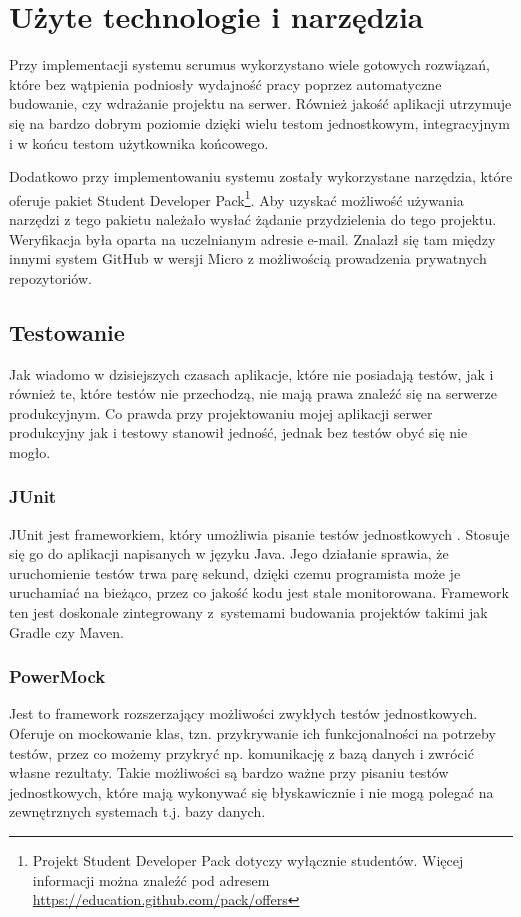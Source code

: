 \section{Użyte technologie i narzędzia}
Przy implementacji systemu scrumus wykorzystano wiele gotowych rozwiązań, które bez wątpienia podniosły wydajność pracy poprzez automatyczne budowanie, czy wdrażanie projektu na serwer. Również jakość aplikacji utrzymuje się na bardzo dobrym poziomie dzięki wielu testom jednostkowym, integracyjnym i w końcu testom użytkownika końcowego. 

Dodatkowo przy implementowaniu systemu zostały wykorzystane narzędzia, które oferuje pakiet Student Developer Pack\footnote{Projekt Student Developer Pack dotyczy wyłącznie studentów. Więcej informacji można znaleźć pod adresem \url{https://education.github.com/pack/offers}}. Aby uzyskać możliwość używania narzędzi z tego pakietu należało wysłać żądanie przydzielenia do tego projektu. Weryfikacja była oparta na uczelnianym adresie e-mail. Znalazł się tam między innymi system GitHub w wersji Micro z możliwością prowadzenia prywatnych repozytoriów.

\subsection{Testowanie}
Jak wiadomo w dzisiejszych czasach aplikacje, które nie posiadają testów, jak i również te, które testów nie przechodzą, nie mają prawa znaleźć się na serwerze produkcyjnym. Co prawda przy projektowaniu mojej aplikacji serwer produkcyjny jak i testowy stanowił jedność, jednak bez testów obyć się nie mogło.

\subsubsection{JUnit}
JUnit jest frameworkiem, który umożliwia pisanie testów jednostkowych \cite{CLEAN_CODE_MASTER}. Stosuje się go do aplikacji napisanych w języku Java. Jego działanie sprawia, że uruchomienie testów trwa parę sekund, dzięki czemu programista może je uruchamiać na bieżąco, przez co jakość kodu jest stale monitorowana. Framework ten jest doskonale zintegrowany z~systemami budowania projektów takimi jak Gradle czy Maven. 

\subsubsection{PowerMock}
Jest to framework rozszerzający możliwości zwykłych testów jednostkowych. Oferuje on mockowanie klas, tzn. przykrywanie ich funkcjonalności na potrzeby testów, przez co możemy przykryć np. komunikację z bazą danych i zwrócić własne rezultaty. Takie możliwości są bardzo ważne przy pisaniu testów jednostkowych, które mają wykonywać się błyskawicznie i nie mogą polegać na zewnętrznych systemach t.j. bazy danych.

